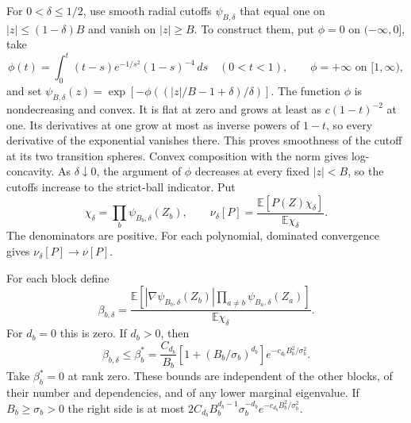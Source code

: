 \documentclass[11pt,letterpaper,reqno]{amsart}
\makeatletter
\numberwithin{equation}{section}
\theoremstyle{definition}
\newcommand{\ms@minorstart}{%
  \pushQED{\qed}\renewcommand{\qedsymbol}{$\blacksquare$}}
\newenvironment{proposition}[1][]{\ms@minorstart\ms@proposition[#1]}
  {\popQED\endms@proposition}
\theoremstyle{remark}
\makeatother
\begin{document}
For \(0<\delta\le1/2\), use smooth radial cutoffs
\(\psi_{B,\delta}\) that equal one on \(|z|\le(1-\delta)B\)
and vanish on \(|z|\ge B\). To construct them, put
\(\phi=0\) on \((-\infty,0]\), take
\[
 \phi(t)=\int_0^t(t-s)e^{-1/s^2}(1-s)^{-4}\,ds
       \quad(0<t<1),\qquad \phi=+\infty\text{ on }[1,\infty),
\]
and set \(\psi_{B,\delta}(z)=
\exp[-\phi((|z|/B-1+\delta)/\delta)]\).
The function \(\phi\) is nondecreasing and convex. It is flat
at zero and grows at least as \(c(1-t)^{-2}\) at one. Its
derivatives at one grow at most as inverse powers of \(1-t\),
so every derivative of the exponential vanishes there.
This proves smoothness of the cutoff at its two transition
spheres. Convex composition with the norm gives log-concavity.
As \(\delta\downarrow0\), the argument of \(\phi\) decreases at
every fixed \(|z|<B\), so the cutoffs increase to the strict-ball
indicator. Put
\[
 \chi_\delta=\prod_b\psi_{B_b,\delta}(Z_b),\qquad
 \nu_\delta[P]=\frac{\mathbb E[P(Z)\chi_\delta]}
                         {\mathbb E\chi_\delta}.
\]
The denominators are positive. For each polynomial, dominated
convergence gives \(\nu_\delta[P]\to\nu[P]\).

\begin{proposition}[Normalized cutoff flux]
\label{gi:prop-gaussian-cutoff-flux}
For each block define
\begin{equation}\label{gi:eq-smooth-flux}
 \beta_{b,\delta}=
 \frac{\mathbb E[|\nabla\psi_{B_b,\delta}(Z_b)|
                \prod_{a\ne b}\psi_{B_a,\delta}(Z_a)]}
      {\mathbb E\chi_\delta}.
\end{equation}
For \(d_b=0\) this is zero. If \(d_b>0\), then
\begin{equation}\label{gi:eq-flux-bound}
 \beta_{b,\delta}\le\beta_b^*=
 \frac{C_{d_b}}{B_b}
 \left[1+(B_b/\sigma_b)^{d_b}\right]
                      e^{-c_{d_b}B_b^2/\sigma_b^2}.
\end{equation}
Take \(\beta_b^*=0\) at rank zero. These bounds are independent
of the other blocks, of their number and dependencies, and of
any lower marginal eigenvalue. If \(B_b\ge\sigma_b>0\) the right
side is at most
\(2 C_{d_b}B_b^{d_b-1}\sigma_b^{-d_b}
 e^{-c_{d_b}B_b^2/\sigma_b^2}\).
\end{proposition}
\end{document}
